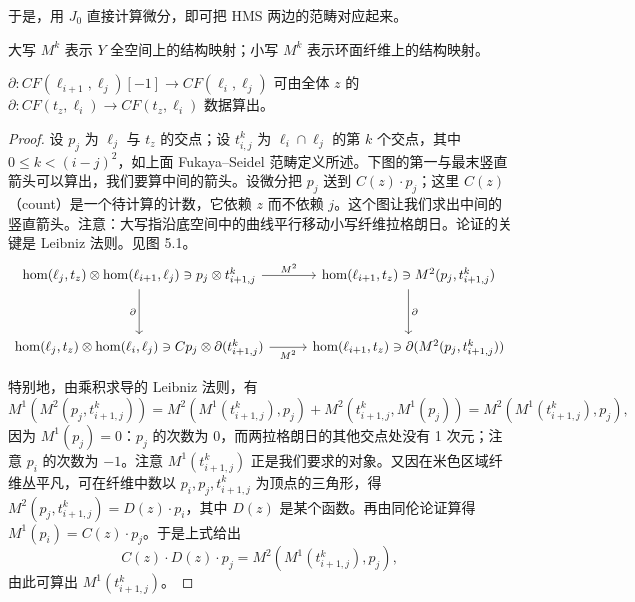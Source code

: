 于是，用 $J_0$ 直接计算微分，即可把 HMS 两边的范畴对应起来。

\begin{remark}[记号]\label{rem:notation-M}
大写 $M^k$ 表示 $Y$ 全空间上的结构映射；小写 $M^k$ 表示环面纤维上的结构映射。
\end{remark}

\begin{lemma}\label{lem:compute-d}
$\partial:CF(\ell_{i+1},\ell_j)[-1]\to CF(\ell_i,\ell_j)$ 可由全体 $z$ 的 $\partial:CF(t_z,\ell_i)\to CF(t_z,\ell_i)$ 数据算出。
\end{lemma}

\begin{proof}
设 $p_j$ 为 $\ell_j$ 与 $t_z$ 的交点；设 $t^k_{i,j}$ 为 $\ell_i\cap\ell_j$ 的第 $k$ 个交点，其中 $0\le k<(i-j)^2$，如上面 Fukaya--Seidel 范畴定义所述。下图的第一与最末竖直箭头可以算出，我们要算中间的箭头。设微分把 $p_j$ 送到 $C(z)\cdot p_j$；这里 $C(z)$（count）是一个待计算的计数，它依赖 $z$ 而不依赖 $j$。这个图让我们求出中间的竖直箭头。注意：大写指沿底空间中的曲线平行移动小写纤维拉格朗日。论证的关键是 Leibniz 法则。见图 5.1。
\[
\begin{tikzcd}[column sep=2.8em, row sep=3.4em]
\hom(\ell_j,t_z)\otimes\hom(\ell_{i+1},\ell_j)\ni p_j\otimes t^k_{i+1,j}
  \arrow[r,"M^2"] \arrow[d,"\partial"'] &
\hom(\ell_{i+1},t_z)\ni M^2(p_j,t^k_{i+1,j}) \arrow[d,"\partial"] \\
\hom(\ell_j,t_z)\otimes\hom(\ell_i,\ell_j)\ni C p_j\otimes\partial(t^k_{i+1,j})
  \arrow[r,"M^2"'] &
\hom(\ell_{i+1},t_z)\ni \partial(M^2(p_j,t^k_{i+1,j}))
\end{tikzcd}
\]

特别地，由乘积求导的 Leibniz 法则，有
\[
M^1(M^2(p_j,t^k_{i+1,j}))
=M^2(M^1(t^k_{i+1,j}),p_j)+M^2(t^k_{i+1,j},M^1(p_j))
=M^2(M^1(t^k_{i+1,j}),p_j),
\]
因为 $M^1(p_j)=0$：$p_j$ 的次数为 0，而两拉格朗日的其他交点处没有 1 次元；注意 $p_i$ 的次数为 $-1$。注意 $M^1(t^k_{i+1,j})$ 正是我们要求的对象。又因在米色区域纤维丛平凡，可在纤维中数以 $p_i,p_j,t^k_{i+1,j}$ 为顶点的三角形，得 $M^2(p_j,t^k_{i+1,j})=D(z)\cdot p_i$，其中 $D(z)$ 是某个函数。再由同伦论证算得 $M^1(p_i)=C(z)\cdot p_j$。于是上式给出
\[
C(z)\cdot D(z)\cdot p_j=M^2(M^1(t^k_{i+1,j}),p_j),
\]
由此可算出 $M^1(t^k_{i+1,j})$。
\end{proof}


